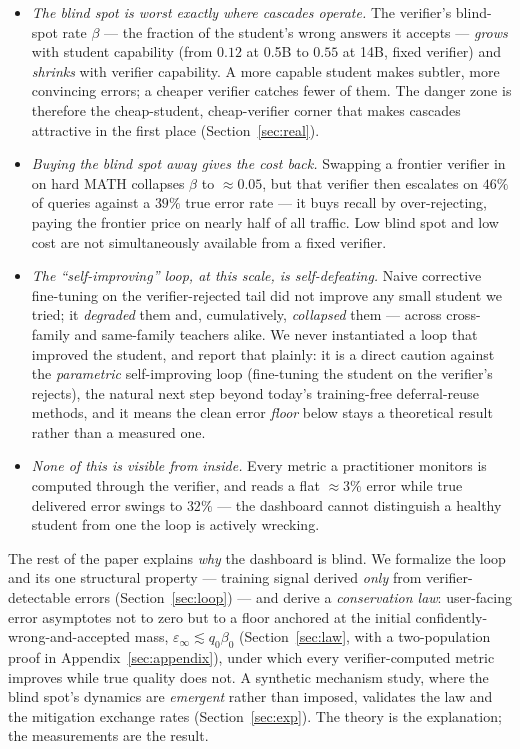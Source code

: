 \documentclass[11pt]{article}
\begin{document}
\begin{itemize}
\item
  \emph{The blind spot is worst exactly where cascades operate.} The
  verifier's blind-spot rate \(\beta\) --- the fraction of the student's
  wrong answers it accepts --- \emph{grows} with student capability
  (from \(0.12\) at 0.5B to \(0.55\) at 14B, fixed verifier) and
  \emph{shrinks} with verifier capability. A more capable student makes
  subtler, more convincing errors; a cheaper verifier catches fewer of
  them. The danger zone is therefore the cheap-student, cheap-verifier
  corner that makes cascades attractive in the first place
  (Section~\ref{sec:real}).
\item
  \emph{Buying the blind spot away gives the cost back.} Swapping a
  frontier verifier in on hard MATH collapses \(\beta\) to
  \(\approx 0.05\), but that verifier then escalates on \(46\%\) of
  queries against a \(39\%\) true error rate --- it buys recall by
  over-rejecting, paying the frontier price on nearly half of all
  traffic. Low blind spot and low cost are not simultaneously available
  from a fixed verifier.
\item
  \emph{The ``self-improving'' loop, at this scale, is self-defeating.}
  Naive corrective fine-tuning on the verifier-rejected tail did not
  improve any small student we tried; it \emph{degraded} them and,
  cumulatively, \emph{collapsed} them --- across cross-family and
  same-family teachers alike. We never instantiated a loop that improved
  the student, and report that plainly: it is a direct caution against
  the \emph{parametric} self-improving loop (fine-tuning the student on
  the verifier's rejects), the natural next step beyond today's
  training-free deferral-reuse methods, and it means the clean error
  \emph{floor} below stays a theoretical result rather than a measured
  one.
\item
  \emph{None of this is visible from inside.} Every metric a
  practitioner monitors is computed through the verifier, and reads a
  flat \(\approx 3\%\) error while true delivered error swings to
  \(32\%\) --- the dashboard cannot distinguish a healthy student from
  one the loop is actively wrecking.
\end{itemize}

The rest of the paper explains \emph{why} the dashboard is blind. We
formalize the loop and its one structural property --- training signal
derived \emph{only} from verifier-detectable errors
(Section~\ref{sec:loop}) --- and derive a \emph{conservation law}:
user-facing error asymptotes not to zero but to a floor anchored at the
initial confidently-wrong-and-accepted mass,
\(\varepsilon_{\infty} \lesssim q_{0}\beta_{0}\) (Section~\ref{sec:law},
with a two-population proof in Appendix~\ref{sec:appendix}), under which
every verifier-computed metric improves while true quality does not. A
synthetic mechanism study, where the blind spot's dynamics are
\emph{emergent} rather than imposed, validates the law and the
mitigation exchange rates (Section~\ref{sec:exp}). The theory is the
explanation; the measurements are the result.
\end{document}
